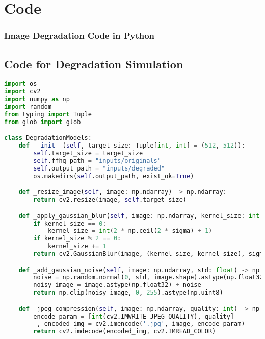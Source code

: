 \chapter{Code} %

\label{AppendixA} 
\begin{sloppypar}


\subsection{Image Degradation Code in Python}


\section*{Code for Degradation Simulation}

\begin{lstlisting}[language=Python]
import os
import cv2
import numpy as np
import random
from typing import Tuple
from glob import glob

class DegradationModels:
    def __init__(self, target_size: Tuple[int, int] = (512, 512)):
        self.target_size = target_size
        self.ffhq_path = "inputs/originals"
        self.output_path = "inputs/degraded"
        os.makedirs(self.output_path, exist_ok=True)

    def _resize_image(self, image: np.ndarray) -> np.ndarray:
        return cv2.resize(image, self.target_size)

    def _apply_gaussian_blur(self, image: np.ndarray, kernel_size: int = 0, sigma: float = 0) -> np.ndarray:
        if kernel_size == 0:
            kernel_size = int(2 * np.ceil(2 * sigma) + 1)
        if kernel_size % 2 == 0:
            kernel_size += 1
        return cv2.GaussianBlur(image, (kernel_size, kernel_size), sigma)

    def _add_gaussian_noise(self, image: np.ndarray, std: float) -> np.ndarray:
        noise = np.random.normal(0, std, image.shape).astype(np.float32)
        noisy_image = image.astype(np.float32) + noise
        return np.clip(noisy_image, 0, 255).astype(np.uint8)

    def _jpeg_compression(self, image: np.ndarray, quality: int) -> np.ndarray:
        encode_param = [int(cv2.IMWRITE_JPEG_QUALITY), quality]
        _, encoded_img = cv2.imencode('.jpg', image, encode_param)
        return cv2.imdecode(encoded_img, cv2.IMREAD_COLOR)


\end{lstlisting}
\end{sloppypar}
